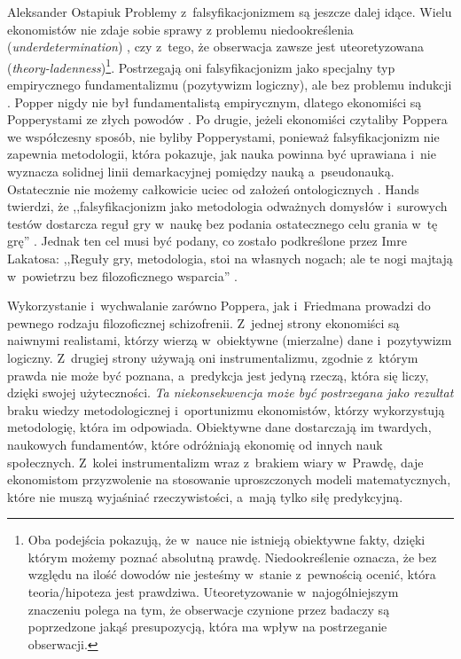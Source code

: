 \begin{artplenv}{Aleksander Ostapiuk}
Problemy z~falsyfikacjonizmem są jeszcze dalej idące. Wielu ekonomistów nie zdaje sobie sprawy z problemu niedookreślenia
(\textit{underdetermination})
\parencite{quine_two_1951},
czy z~tego, że obserwacja zawsze jest
uteoretyzowana (\textit{theory-ladenness})\footnote{Oba podejścia pokazują, że w~nauce nie istnieją obiektywne fakty,
dzięki którym możemy poznać absolutną prawdę. Niedookreślenie oznacza, że bez względu na ilość dowodów nie jesteśmy
w~stanie z~pewnością ocenić, która teoria/hipoteza jest prawdziwa. Uteoretyzowanie w~najogólniejszym znaczeniu polega na
tym, że obserwacje czynione przez badaczy są poprzedzone jakąś presupozycją, która ma wpływ na postrzeganie obserwacji.}.
Postrzegają oni falsyfikacjonizm jako specjalny typ empirycznego fundamentalizmu (pozytywizm logiczny), ale bez
problemu indukcji
\parencite[s.~292]{hands_reflection_2001}.
Popper nigdy nie był fundamentalistą empirycznym,
dlatego ekonomiści są Popperystami ze złych powodów
\parencite[s.~292]{hands_reflection_2001}.
Po drugie, jeżeli
ekonomiści czytaliby Poppera we współczesny sposób, nie byliby Popperystami, ponieważ falsyfikacjonizm nie zapewnia
metodologii, która pokazuje, jak nauka powinna być uprawiana i~nie wyznacza solidnej linii demarkacyjnej pomiędzy nauką
a~pseudonauką. Ostatecznie nie możemy całkowicie uciec od założeń ontologicznych
\parencite{kuhn_structure_1962,feyerabend_against_1975,mccloskey_rhetoric_1998,hands_reflection_2001}.
Hands twierdzi, że ,,falsyfikacjonizm jako metodologia odważnych
domysłów i~surowych testów dostarcza reguł gry w~naukę bez podania ostatecznego celu grania w~tę grę''
\parencite[s.~293]{hands_reflection_2001}.
Jednak ten cel musi być podany, co zostało podkreślone przez Imre Lakatosa:
,,Reguły gry, metodologia, stoi na własnych nogach; ale te nogi majtają w~powietrzu bez filozoficznego wsparcia''
\parencite[s.~154]{lakatos_methodology_1980}.

Wykorzystanie i~wychwalanie zarówno Poppera, jak i~Friedmana prowadzi do pewnego rodzaju filozoficznej
schizofrenii. Z~jednej strony ekonomiści są naiwnymi realistami, którzy wierzą w~obiektywne (mierzalne)
dane i~pozytywizm logiczny. Z~drugiej strony używają oni instrumentalizmu,
zgodnie z~którym prawda nie może być poznana, a~predykcja jest jedyną rzeczą, która
się liczy, dzięki swojej użyteczności. \textit{Ta niekonsekwencja może być postrzegana jako rezultat} braku wiedzy
metodologicznej i~oportunizmu ekonomistów, którzy wykorzystują metodologię, która im odpowiada. Obiektywne dane dostarczają im
twardych, naukowych fundamentów, które odróżniają ekonomię od innych nauk społecznych. Z~kolei instrumentalizm
wraz z~brakiem wiary w~Prawdę, daje ekonomistom przyzwolenie na stosowanie uproszczonych modeli matematycznych,
które nie muszą wyjaśniać
rzeczywistości, a~mają tylko siłę predykcyjną. 


\end{artplenv}
